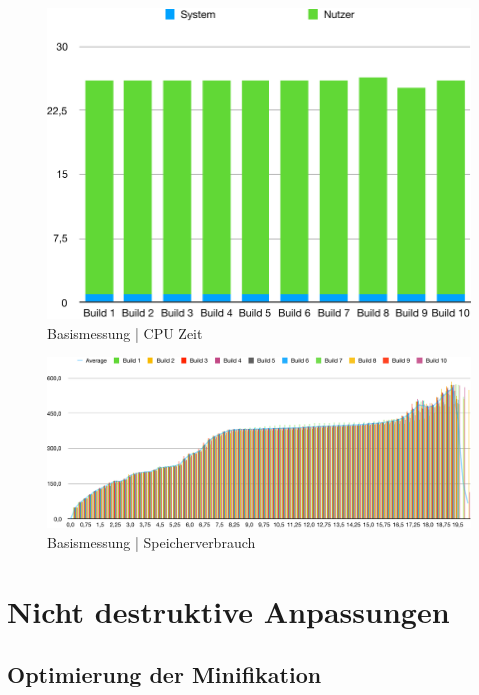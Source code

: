 \documentclass[11pt]{report}
\begin{document}
			\begin{figure}[p]
	            \includegraphics[width=\textwidth]{img/baseline_duration.pdf}
	            \caption{Basismessung | CPU Zeit}
	            \label{figure:baseline_duration}
	        \end{figure}
	        \begin{figure}[p]
	            \includegraphics[width=\textwidth]{img/baseline_memory.pdf}
	            \caption{Basismessung | Speicherverbrauch}
	            \label{figure:baseline_memory}
	        \end{figure}

        \section{Nicht destruktive Anpassungen}
        	\label{section:productionOptimizations}
        	\subsection{Optimierung der Minifikation}
\end{document}
